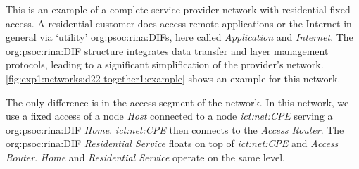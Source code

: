 This is an example of a complete service provider network with residential fixed access.
A residential customer does access remote applications or the Internet in general via `utility' \acp{org:psoc:rina:DIF}, here called \textit{Application} and \textit{Internet}.
The \ac{org:psoc:rina:DIF} structure integrates data transfer and layer management protocols, leading to a significant simplification of the provider's network.
\autoref{fig:exp1:networks:d22-together1:example} shows an example for this network.

The only difference is in the access segment of the network.
In this network, we use a fixed access of a node \textit{Host} connected to a node \textit{\acs{ict:net:CPE}} serving a \ac{org:psoc:rina:DIF} \textit{Home}.
\textit{\acs{ict:net:CPE}} then connects to the \textit{Access Router}.
The \ac{org:psoc:rina:DIF} \textit{Residential Service} floats on top of \textit{ict:net:CPE} and \textit{Access Router}.
\textit{Home} and \textit{Residential Service} operate on the same level.

